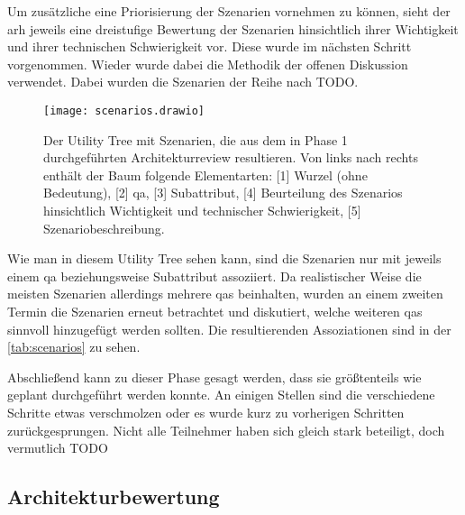Um zusätzliche eine Priorisierung der Szenarien vornehmen zu können, sieht der \gls{arh} jeweils eine dreistufige Bewertung der Szenarien hinsichtlich ihrer Wichtigkeit und ihrer technischen Schwierigkeit vor.
Diese wurde im nächsten Schritt vorgenommen.
Wieder wurde dabei die Methodik der offenen Diskussion verwendet.
Dabei wurden die Szenarien der Reihe nach TODO.



\begin{landscape}
	\begin{figure}
		\centering
		\texttt{[image: scenarios.drawio]}
		\caption[Utility Tree mit im Architekturreview ermittelten Qualitätsanforderungen und Szenarien]{
			Der Utility Tree mit Szenarien, die aus dem in Phase 1 durchgeführten Architekturreview resultieren.
			Von links nach rechts enthält der Baum folgende Elementarten: [1] Wurzel (ohne Bedeutung), [2] \gls{qa}, [3] Subattribut, [4] Beurteilung des Szenarios hinsichtlich Wichtigkeit und technischer Schwierigkeit, [5] Szenariobeschreibung.
		}
		\label{fig:scenarios}
	\end{figure}
\end{landscape}

Wie man in diesem Utility Tree sehen kann, sind die Szenarien nur mit jeweils einem \gls{qa} beziehungsweise Subattribut assoziiert.
Da realistischer Weise die meisten Szenarien allerdings mehrere \glspl{qa} beinhalten, wurden an einem zweiten Termin die Szenarien erneut betrachtet und diskutiert, welche weiteren \glspl{qa} sinnvoll hinzugefügt werden sollten.
Die resultierenden Assoziationen sind in der \cref{tab:scenarios} zu sehen.



Abschließend kann zu dieser Phase gesagt werden, dass sie größtenteils wie geplant durchgeführt werden konnte.
An einigen Stellen sind die verschiedene Schritte etwas verschmolzen oder es wurde kurz zu vorherigen Schritten zurückgesprungen.
Nicht alle Teilnehmer haben sich gleich stark beteiligt, doch vermutlich TODO

\subsection{Architekturbewertung}

